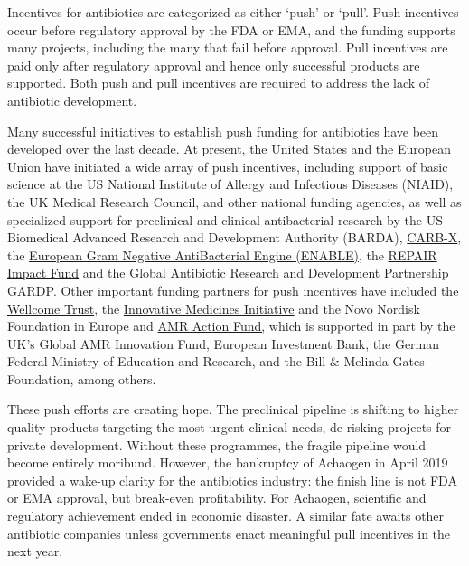 \documentclass[
]{book}
\begin{document}
Incentives for antibiotics are categorized as either `push' or `pull'. Push incentives occur before regulatory approval by the FDA or EMA, and the funding supports many projects, including the many that fail before approval. Pull incentives are paid only after regulatory approval and hence only successful products are supported. Both push and pull incentives are required to address the lack of antibiotic development.

Many successful initiatives to establish push funding for antibiotics have been developed over the last decade. At present, the United States and the European Union have initiated a wide array of push incentives, including support of basic science at the US National Institute of Allergy and Infectious Diseases (NIAID), the UK Medical Research Council, and other national funding agencies, as well as specialized support for preclinical and clinical antibacterial research by the US Biomedical Advanced Research and Development Authority (BARDA), \href{https://carb-x.org/}{CARB-X}, the \href{https://www.imi.europa.eu/projects-results/project-factsheets/enable}{European Gram Negative AntiBacterial Engine (ENABLE)}, the \href{https://www.repair-impact-fund.com/}{REPAIR Impact Fund} and the Global Antibiotic Research and Development Partnership \href{https://www.gardp.org/}{GARDP}. Other important funding partners for push incentives have included the \href{https://wellcome.org/}{Wellcome Trust}, the \href{https://www.imi.europa.eu/}{Innovative Medicines Initiative} and the Novo Nordisk Foundation in Europe and \href{https://www.amractionfund.com/}{AMR Action Fund,} which is supported in part by the UK's Global AMR Innovation Fund, European Investment Bank, the German Federal Ministry of Education and Research, and the Bill \& Melinda Gates Foundation, among others.

These push efforts are creating hope. The preclinical pipeline is shifting to higher quality products targeting the most urgent clinical needs, de-risking projects for private development. Without these programmes, the fragile pipeline would become entirely moribund. However, the bankruptcy of Achaogen in April 2019 provided a wake-up clarity for the antibiotics industry: the finish line is not FDA or EMA approval, but break-even profitability. For Achaogen, scientific and regulatory achievement ended in economic disaster. A similar fate awaits other antibiotic companies unless governments enact meaningful pull incentives in the next year.
\end{document}
